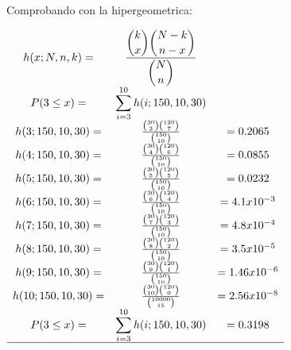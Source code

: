 \documentclass[12pt, letterpaper]{article}
\begin{document}
    Comprobando con la hipergeometrica:\\
    \begin{center}
        \begin{math}
            \begin{array}{ccc}
                h(x;N,n,k)=&\displaystyle\frac{{\displaystyle\binom{k}{x} \displaystyle\binom{N-k}{n-x}}}{\displaystyle\binom{N}{n}}&\\
                P(3\leq x)=&\displaystyle\sum^{10}_{i=3} h(i;150,10,30)&\\ 
                h(3;150,10,30)= & \frac{\binom{30}{3} \binom{120}{7}}{\binom{150}{10}}&=0.2065\\
                h(4;150,10,30)= & \frac{\binom{30}{4} \binom{120}{6}}{\binom{150}{10}}&=0.0855\\
                h(5;150,10,30)= & \frac{\binom{30}{5} \binom{120}{5}}{\binom{150}{10}}&=0.0232\\
                h(6;150,10,30)= & \frac{\binom{30}{6} \binom{120}{4}}{\binom{150}{10}}&=4.1x10^{-3}\\
                h(7;150,10,30)= & \frac{\binom{30}{7} \binom{120}{3}}{\binom{150}{10}}&=4.8x10^{-4}\\
                h(8;150,10,30)= & \frac{\binom{30}{8} \binom{120}{2}}{\binom{150}{10}}&=3.5x10^{-5}\\
                h(9;150,10,30)= & \frac{\binom{30}{9} \binom{120}{1}}{\binom{150}{10}}&=1.46x10^{-6}\\
                h(10;150,10,30)= & \frac{\binom{30}{10} \binom{120}{0}}{\binom{10000}{15}}&=2.56x10^{-8}\\
                P(3\leq x)=&\displaystyle\sum^{10}_{i=3} h(i;150,10,30)&=0.3198\\
                \hline
                \end{array}
        \end{math}\\
    \end{center}\vskip1cm 
\end{document}
